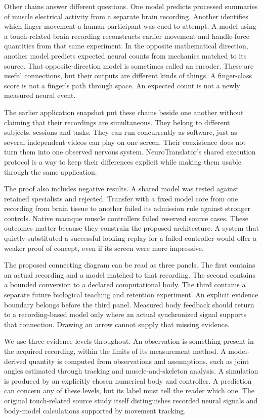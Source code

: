 Other chains answer different questions. One model predicts processed summaries of muscle electrical activity from a separate brain recording. Another identifies which finger movement a human participant was cued to attempt. A model using a touch-related brain recording reconstructs earlier movement and handle-force quantities from that same experiment. In the opposite mathematical direction, another model predicts expected neural counts from mechanics matched to its source. That opposite-direction model is sometimes called an encoder. These are useful connections, but their outputs are different kinds of things. A finger-class score is not a finger's path through space. An expected count is not a newly measured neural event.

The earlier application snapshot put these chains beside one another without claiming that their recordings are simultaneous. They belong to different subjects, sessions and tasks. They can run concurrently as software, just as several independent videos can play on one screen. Their coexistence does not turn them into one observed nervous system. NeuroTranslator's shared execution protocol is a way to keep their differences explicit while making them usable through the same application.

The proof also includes negative results. A shared model was tested against retained specialists and rejected. Transfer with a fixed model core from one recording from brain tissue to another failed its admission rule against stronger controls. Native macaque muscle controllers failed reserved source cases. These outcomes matter because they constrain the proposed architecture. A system that quietly substituted a successful-looking replay for a failed controller would offer a weaker proof of concept, even if its screen were more impressive.

The proposed connecting diagram can be read as three panels. The first contains an actual recording and a model matched to that recording. The second contains a bounded conversion to a declared computational body. The third contains a separate future biological teaching and retention experiment. An explicit evidence boundary belongs before the third panel. Measured body feedback should return to a recording-based model only where an actual synchronized signal supports that connection. Drawing an arrow cannot supply that missing evidence.

We use three evidence levels throughout. An observation is something present in the acquired recording, within the limits of its measurement method. A model-derived quantity is computed from observations and assumptions, such as joint angles estimated through tracking and muscle-and-skeleton analysis. A simulation is produced by an explicitly chosen numerical body and controller. A prediction can concern any of these levels, but its label must tell the reader which one. The original touch-related source study itself distinguishes recorded neural signals and body-model calculations supported by movement tracking.\cite{chowdhury2020}

